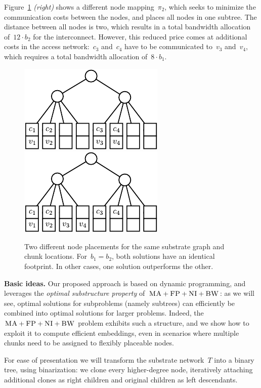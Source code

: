 \documentclass[preprint,12pt]{elsarticle}
\newcommand{\NodeMapping}{\pi}
\newcommand{\CC}{\textsc{NI}}
\newcommand{\FP}{\textsc{FP}}
\newcommand{\BW}{\textsc{BW}}
\newcommand{\MA}{\textsc{MA}}
\newcommand{\Tree}{\ensuremath{T}}
\newcommand{\CostTrans}{\ensuremath{b_1}}
\newcommand{\CostCom}{\ensuremath{b_2}}
\begin{document}
Figure~\ref{fig:dynamic_motivation} \emph{(right)} shows a different node
mapping~$\NodeMapping_2$, which seeks to minimize the communication costs
between the nodes, and places all nodes in one subtree. The distance between all
nodes is two, which results in a total bandwidth allocation of~$12\cdot\CostCom$
for the interconnect. However, this reduced price comes at additional costs in
the access network:~$c_3$ and~$c_4$ have to be communicated to~$v_3$ and~$v_4$,
which requires a total bandwidth allocation of~$8 \cdot \CostTrans$.


\begin{figure}
\includegraphics[width = 0.49\columnwidth]{figs/dynamic_bad}
\hfill
\includegraphics[width = 0.49\columnwidth]{figs/dynamic_good}
\caption{Two different node placements for the same substrate graph and chunk
locations. For~$\CostTrans = \CostCom$, both solutions have an identical
footprint. In other cases, one solution outperforms the other.}
\label{fig:dynamic_motivation}
\vspace{-1em}
\end{figure}



\textbf{Basic ideas.} Our proposed approach is based on dynamic programming, and
leverages the \emph{optimal substructure property} of~$\MA+\FP+\CC+\BW$:
as we will see, optimal solutions for subproblems (namely subtrees)
can efficiently be combined into optimal solutions for larger problems.
Indeed, the~$\MA+\FP+\CC+\BW$ problem
exhibits such a structure, and we show how to exploit it to
compute efficient embeddings, even in scenarios where multiple chunks
need to be assigned to flexibly placeable nodes.

For ease of presentation we will transform the
substrate network~$\Tree$
into a binary tree, using binarization:
we clone every higher-degree node,
iteratively attaching additional clones as right children
and original children as left descendants.
\end{document}
